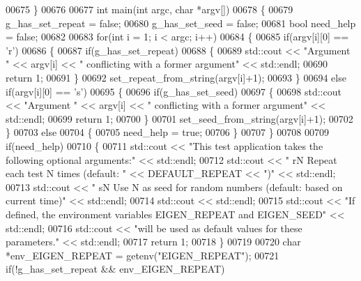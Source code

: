 \begin{DoxyCode}
00675 \}
00676 
00677 \textcolor{keywordtype}{int} main(\textcolor{keywordtype}{int} argc, \textcolor{keywordtype}{char} *argv[])
00678 \{
00679     g\_has\_set\_repeat = \textcolor{keyword}{false};
00680     g\_has\_set\_seed = \textcolor{keyword}{false};
00681     \textcolor{keywordtype}{bool} need\_help = \textcolor{keyword}{false};
00682 
00683     \textcolor{keywordflow}{for}(\textcolor{keywordtype}{int} i = 1; i < argc; i++)
00684     \{
00685       \textcolor{keywordflow}{if}(argv[i][0] == \textcolor{charliteral}{'r'})
00686       \{
00687         \textcolor{keywordflow}{if}(g\_has\_set\_repeat)
00688         \{
00689           std::cout << \textcolor{stringliteral}{"Argument "} << argv[i] << \textcolor{stringliteral}{" conflicting with a former argument"} << std::endl;
00690           \textcolor{keywordflow}{return} 1;
00691         \}
00692         set\_repeat\_from\_string(argv[i]+1);
00693       \}
00694       \textcolor{keywordflow}{else} \textcolor{keywordflow}{if}(argv[i][0] == \textcolor{charliteral}{'s'})
00695       \{
00696         \textcolor{keywordflow}{if}(g\_has\_set\_seed)
00697         \{
00698           std::cout << \textcolor{stringliteral}{"Argument "} << argv[i] << \textcolor{stringliteral}{" conflicting with a former argument"} << std::endl;
00699           \textcolor{keywordflow}{return} 1;
00700         \}
00701          set\_seed\_from\_string(argv[i]+1);
00702       \}
00703       \textcolor{keywordflow}{else}
00704       \{
00705         need\_help = \textcolor{keyword}{true};
00706       \}
00707     \}
00708 
00709     \textcolor{keywordflow}{if}(need\_help)
00710     \{
00711       std::cout << \textcolor{stringliteral}{"This test application takes the following optional arguments:"} << std::endl;
00712       std::cout << \textcolor{stringliteral}{"  rN     Repeat each test N times (default: "} << DEFAULT\_REPEAT << \textcolor{stringliteral}{")"} << std::endl;
00713       std::cout << \textcolor{stringliteral}{"  sN     Use N as seed for random numbers (default: based on current time)"} << 
      std::endl;
00714       std::cout << std::endl;
00715       std::cout << \textcolor{stringliteral}{"If defined, the environment variables EIGEN\_REPEAT and EIGEN\_SEED"} << std::endl;
00716       std::cout << \textcolor{stringliteral}{"will be used as default values for these parameters."} << std::endl;
00717       \textcolor{keywordflow}{return} 1;
00718     \}
00719 
00720     \textcolor{keywordtype}{char} *env\_EIGEN\_REPEAT = getenv(\textcolor{stringliteral}{"EIGEN\_REPEAT"});
00721     \textcolor{keywordflow}{if}(!g\_has\_set\_repeat && env\_EIGEN\_REPEAT)

\end{DoxyCode}
